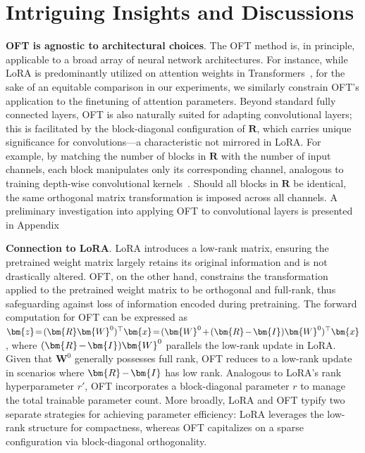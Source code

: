 \section{Intriguing Insights and Discussions}

\textbf{OFT is agnostic to architectural choices}. The OFT method is, in principle, applicable to a broad array of neural network architectures. For instance, while LoRA is predominantly utilized on attention weights in Transformers~\cite{hulora2022}, for the sake of an equitable comparison in our experiments, we similarly constrain OFT’s application to the finetuning of attention parameters. Beyond standard fully connected layers, OFT is also naturally suited for adapting convolutional layers; this is facilitated by the block-diagonal configuration of $\bm{R}$, which carries unique significance for convolutions—a characteristic not mirrored in LoRA. For example, by matching the number of blocks in $\bm{R}$ with the number of input channels, each block manipulates only its corresponding channel, analogous to training depth-wise convolutional kernels~\cite{chollet2017xception}. Should all blocks in $\bm{R}$ be identical, the same orthogonal matrix transformation is imposed across all channels. A preliminary investigation into applying OFT to convolutional layers is presented in Appendix~

\textbf{Connection to LoRA}. LoRA introduces a low-rank matrix, ensuring the pretrained weight matrix largely retains its original information and is not drastically altered. OFT, on the other hand, constrains the transformation applied to the pretrained weight matrix to be orthogonal and full-rank, thus safeguarding against loss of information encoded during pretraining. The forward computation for OFT can be expressed as $\thickmuskip=2mu \medmuskip=2mu \bm{z}=(\bm{R}\bm{W}^0)^\top\bm{x}=(\bm{W}^0+(\bm{R}-\bm{I})\bm{W}^0)^\top\bm{x}$, where $\thickmuskip=2mu \medmuskip=2mu (\bm{R}-\bm{I})\bm{W}^0$ parallels the low-rank update in LoRA. Given that $\bm{W}^0$ generally possesses full rank, OFT reduces to a low-rank update in scenarios where $\thickmuskip=2mu \medmuskip=2mu \bm{R}-\bm{I}$ has low rank. Analogous to LoRA's rank hyperparameter $r'$, OFT incorporates a block-diagonal parameter $r$ to manage the total trainable parameter count. More broadly, LoRA and OFT typify two separate strategies for achieving parameter efficiency: LoRA leverages the low-rank structure for compactness, whereas OFT capitalizes on a sparse configuration via block-diagonal orthogonality.

